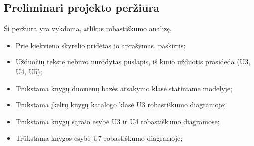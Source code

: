 \documentclass{VUMIFPSkursinis}
\begin{document}
	\subsection{Preliminari projekto peržiūra}
		Ši peržiūra yra vykdoma, atlikus robastiškumo analizę.	%
		\begin{itemize}
			\item Prie kiekvieno skyrelio pridėtas jo aprašymas, paskirtis;
			\item Užduočių tekste nebuvo nurodytas puslapis, iš kurio užduotis prasideda (U3, U4, U5);
			\item Trūkstama knygų duomenų bazės atsakymo klasė statiniame modelyje;
			\item Trūkstama įkeltų knygų katalogo klasė U3 robastiškumo diagramoje;
			\item Trūkstama knygų sąrašo esybė U3 ir U4 robastiškumo diagramose;
			\item Trūkstama knygos esybė U7 robastiškumo diagramoje;
		\end{itemize}
	
\setcounter{secnumdepth}{0}
\end{document}
